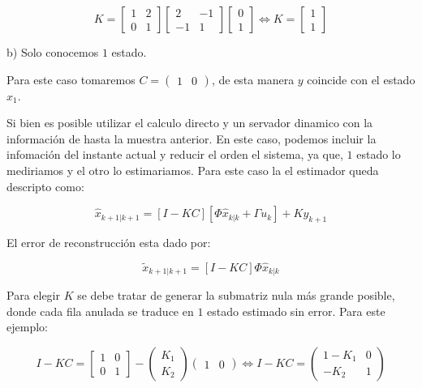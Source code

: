 \begin{equation}
    K = 
    \begin{bmatrix}
        1 & 2 \\ 
        0 & 1
    \end{bmatrix} 
    \begin{bmatrix}
        2 & -1 \\ 
        -1 & 1    
    \end{bmatrix}
    \begin{bmatrix}
        0 \\ 1
    \end{bmatrix} \Leftrightarrow 
    K = \begin{bmatrix}
        1 \\ 1
    \end{bmatrix}
\end{equation}

b) Solo conocemos $1$ estado. 

Para este caso tomaremos $C=\begin{pmatrix}
    1 & 0
\end{pmatrix}$, de esta manera $y$ coincide con el estado $x_1$. 

Si bien es posible utilizar el calculo directo y un servador dinamico con la información 
de hasta la muestra anterior. En este caso, podemos incluir la infomación del instante actual
y reducir el orden el sistema, ya que, $1$ estado lo mediriamos y el otro lo estimariamos. 
Para este caso la el estimador queda descripto como: 

\begin{equation}
    \hat{x}_{k+1|k+1} = [I-KC][\Phi\hat{x}_{k|k} + \Gamma u_k ]+ Ky_{k+1}
\end{equation}

El error de reconstrucción esta dado por: 

\begin{equation}
 \tilde{x}_{k+1|k+1} = [I-KC]\Phi\hat{x}_{k|k}
\end{equation}

Para elegir $K$ se debe tratar de generar la submatriz nula más grande posible, 
donde cada fila anulada se traduce en $1$ estado estimado sin error. Para este ejemplo: 

\begin{equation}
    I-KC = 
    \begin{bmatrix}
        1 & 0 \\ 
        0 & 1
    \end{bmatrix} - 
    \begin{pmatrix}
        K_1 \\ K_2
    \end{pmatrix} 
    \begin{pmatrix}
        1 & 0
    \end{pmatrix} \Leftrightarrow 
    I-KC = 
    \begin{pmatrix}
        1-K_1 & 0 \\ 
        -K_2 & 1
    \end{pmatrix}
\end{equation}

